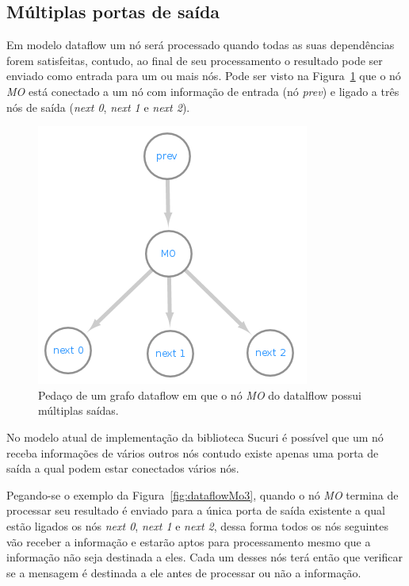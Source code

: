 \subsection{Múltiplas portas de saída}\label{subsec:multiplasSaidas}

Em modelo dataflow um nó será processado quando todas as suas dependências forem satisfeitas, contudo, ao final de seu processamento o resultado pode ser enviado como entrada para um ou mais nós.
Pode ser visto na Figura~\ref{fig:dataflowMo0} que o nó \textit{MO} está conectado a um nó com informação de entrada (nó \textit{prev}) e ligado a três nós de saída (\textit{next 0}, \textit{next 1} e \textit{next 2}).

\begin{figure}[htbp]
    \centerline{\includegraphics[scale=0.9]{figuras/dataflow/multi_output0.png}}
    \caption{Pedaço de um grafo dataflow em que o nó \textit{MO} do datalflow possui múltiplas saídas.}
    \label{fig:dataflowMo0}
\end{figure}

No modelo atual de implementação da biblioteca Sucuri é possível que um nó receba informações de vários outros nós contudo existe apenas uma porta de saída a qual podem estar conectados vários nós.

Pegando-se o exemplo da Figura~\ref{fig:dataflowMo3}, quando o nó \textit{MO} termina de processar seu resultado é enviado para a única porta de saída existente a qual estão ligados os nós \textit{next 0}, \textit{next 1} e \textit{next 2}, dessa forma todos os nós seguintes vão receber a informação e estarão aptos para processamento mesmo que a informação não seja destinada a eles.
Cada um desses nós terá então que verificar se a mensagem é destinada a ele antes de processar ou não a informação.

